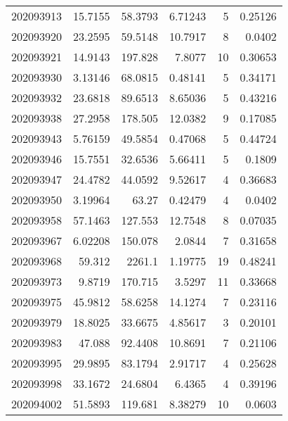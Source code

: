 \begin{tabular}{rrrrrr}
 202093913 &         15.7155  &       58.3793 &            6.71243 &           5 & 0.25126 \\
 202093920 &         23.2595  &       59.5148 &           10.7917  &           8 & 0.0402  \\
 202093921 &         14.9143  &      197.828  &            7.8077  &          10 & 0.30653 \\
 202093930 &          3.13146 &       68.0815 &            0.48141 &           5 & 0.34171 \\
 202093932 &         23.6818  &       89.6513 &            8.65036 &           5 & 0.43216 \\
 202093938 &         27.2958  &      178.505  &           12.0382  &           9 & 0.17085 \\
 202093943 &          5.76159 &       49.5854 &            0.47068 &           5 & 0.44724 \\
 202093946 &         15.7551  &       32.6536 &            5.66411 &           5 & 0.1809  \\
 202093947 &         24.4782  &       44.0592 &            9.52617 &           4 & 0.36683 \\
 202093950 &          3.19964 &       63.27   &            0.42479 &           4 & 0.0402  \\
 202093958 &         57.1463  &      127.553  &           12.7548  &           8 & 0.07035 \\
 202093967 &          6.02208 &      150.078  &            2.0844  &           7 & 0.31658 \\
 202093968 &         59.312   &     2261.1    &            1.19775 &          19 & 0.48241 \\
 202093973 &          9.8719  &      170.715  &            3.5297  &          11 & 0.33668 \\
 202093975 &         45.9812  &       58.6258 &           14.1274  &           7 & 0.23116 \\
 202093979 &         18.8025  &       33.6675 &            4.85617 &           3 & 0.20101 \\
 202093983 &         47.088   &       92.4408 &           10.8691  &           7 & 0.21106 \\
 202093995 &         29.9895  &       83.1794 &            2.91717 &           4 & 0.25628 \\
 202093998 &         33.1672  &       24.6804 &            6.4365  &           4 & 0.39196 \\
 202094002 &         51.5893  &      119.681  &            8.38279 &          10 & 0.0603  \\

\end{tabular}
